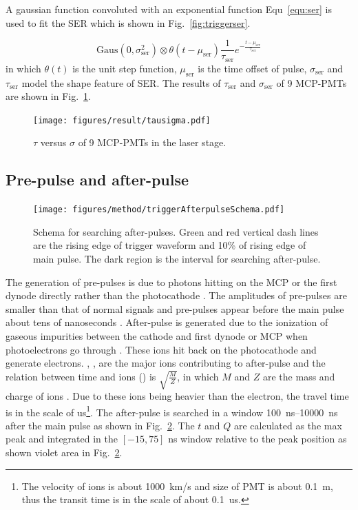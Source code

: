 A gaussian function convoluted with an exponential function Equ~\eqref{equ:ser} is used to fit the SER which is shown in Fig.~\ref{fig:triggerser}.

\begin{equation}
    \label{equ:ser}
    \mathrm{Gaus}(0,\sigma_{\mathrm{ser}}^2)\otimes\theta(t-\mu_{\mathrm{ser}})\frac{1}{\tau_{\mathrm{ser}}}e^{-\frac{t-\mu_{\mathrm{ser}}}{\tau_{\mathrm{ser}}}}
\end{equation}
in which $\theta(t)$ is the unit step function, $\mu_{\mathrm{ser}}$ is the time offset of pulse, $\sigma_{\mathrm{ser}}$ and $\tau_{\mathrm{ser}}$ model the shape feature of SER. The results of $\tau_{\mathrm{ser}}$ and $\sigma_{\mathrm{ser}}$ of 9 MCP-PMTs are shown in Fig.~\ref{fig:sigmaCompare}.
\begin{figure}[!htbp]
    \centering
    \texttt{[image: figures/result/tausigma.pdf]}
    \caption{$\tau$ versus $\sigma$ of 9 MCP-PMTs in the laser stage.}
    \label{fig:sigmaCompare}
\end{figure}


\subsection{Pre-pulse and after-pulse}

\begin{figure}
    \centering
    \texttt{[image: figures/method/triggerAfterpulseSchema.pdf]}
    \caption{Schema for searching after-pulses. Green and red vertical dash lines are the rising edge of trigger waveform and 10\% of rising edge of main pulse. The dark region is the interval for searching after-pulse.}
    \label{fig:afterpulseSchema}
\end{figure}

The generation of pre-pulses is due to photons hitting on the MCP or the first dynode directly rather than the photocathode \cite{JUNOMassTesting}. The amplitudes of pre-pulses are smaller than that of normal signals and pre-pulses appear before the main pulse about tens of nanoseconds \cite{JUNOMassTesting}. After-pulse is generated due to the ionization of gaseous impurities between the cathode and first dynode or MCP when photoelectrons go through \cite{Coates_1973}. These ions hit back on the photocathode and generate electrons. , ,  are the major ions contributing to after-pulse and the relation between time and ions () is $\sqrt{\frac{M}{Z}}$, in which $M$ and $Z$ are the mass and charge of ions \cite{Coates_1973}. Due to these ions being heavier than the electron, the travel time is in the scale of \si{us}\footnote{The velocity of ions is about \SI{1000}{km/s} and size of PMT is about \SI{0.1}{m}, thus the transit time is in the scale of about \SI{0.1}{us}.}. The after-pulse is searched in a window \SIrange{100}{10000}{ns} after the main pulse as shown in Fig.~\ref{fig:afterpulseSchema}. The $t$ and $Q$ are calculated as the max peak and integrated in the $[-15,75]$ ns window relative to the peak position as shown violet area in Fig.~\ref{fig:afterpulseSchema}.

